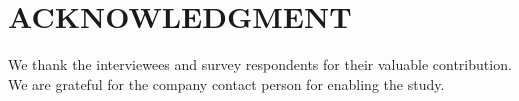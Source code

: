 \documentclass[letterpaper, 10 pt, conference]{ieeeconf}  %
\begin{document}
\addtolength{\textheight}{-12cm}   %








\section*{ACKNOWLEDGMENT}

We thank the interviewees and survey respondents for their valuable contribution. We are grateful for the company contact person for enabling the study. 



\end{document}
